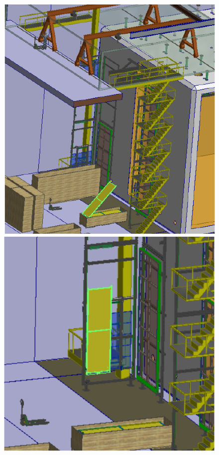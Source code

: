 \begin{figure}[htbp]
\begin{center}
\begin{minipage}[c]{0.32\textwidth}
\includegraphics[width=\textwidth]{far-detector-single-phase/figures/CPA-1.pdf}
\end{minipage}
\begin{minipage}[c]{0.32\textwidth}
\includegraphics[width=\textwidth]{far-detector-single-phase/figures/CPA-2.pdf}

\end{minipage}
\end{center}
\end{figure}
